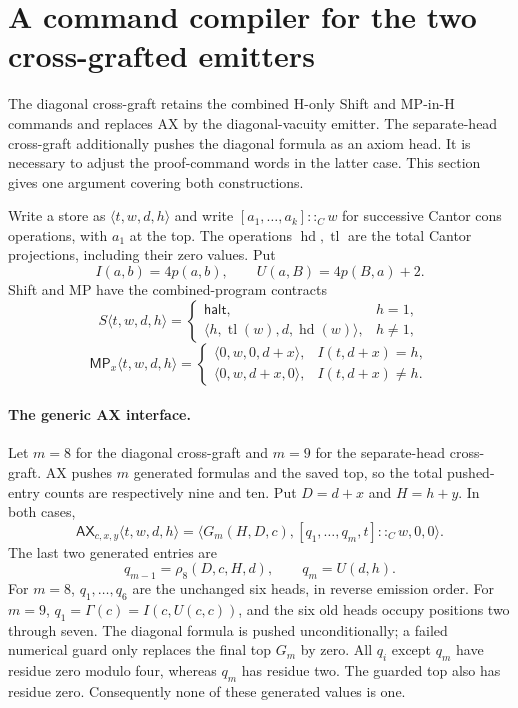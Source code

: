 \section{A command compiler for the two cross-grafted emitters}
\label{sec:graft-command-compiler}

The diagonal cross-graft retains the combined H-only Shift and MP-in-H
commands and replaces AX by the diagonal-vacuity emitter. The separate-head
cross-graft additionally pushes the diagonal formula as an axiom head. It
is necessary to adjust the proof-command words in the latter case. This
section gives one argument covering both constructions.

Write a store as $\langle t,w,d,h\rangle$ and write
$[a_1,\ldots,a_k]::_Cw$ for successive Cantor cons operations, with $a_1$
at the top. The operations $\operatorname{hd},\operatorname{tl}$ are the
total Cantor projections, including their zero values. Put
\[
 I(a,b)=4p(a,b),\qquad U(a,B)=4p(B,a)+2.
\]
Shift and MP have the combined-program contracts
\[
 S\langle t,w,d,h\rangle=
 \begin{cases}\mathsf{halt},&h=1,\\
 \langle h,\operatorname{tl}(w),d,\operatorname{hd}(w)\rangle,&h\ne1,
 \end{cases}
\]
\[
 \mathsf{MP}_x\langle t,w,d,h\rangle=
 \begin{cases}
 \langle0,w,0,d+x\rangle,&I(t,d+x)=h,\\
 \langle0,w,d+x,0\rangle,&I(t,d+x)\ne h.
 \end{cases}
\]

\paragraph{The generic AX interface.}
Let $m=8$ for the diagonal cross-graft and $m=9$ for the separate-head
cross-graft. AX pushes $m$ generated formulas and the saved top, so the
total pushed-entry counts are respectively nine and ten. Put
$D=d+x$ and $H=h+y$. In both cases,
\[
 \mathsf{AX}_{c,x,y}\langle t,w,d,h\rangle
  =\langle G_m(H,D,c),[q_1,\ldots,q_m,t]::_Cw,0,0\rangle.
\]
The last two generated entries are
\[
 q_{m-1}=\rho_8(D,c,H,d),\qquad q_m=U(d,h).
\]
For $m=8$, $q_1,\ldots,q_6$ are the unchanged six heads, in reverse
emission order. For $m=9$, $q_1=\Gamma(c)=I(c,U(c,c))$, and the six old
heads occupy positions two through seven. The diagonal formula is pushed
unconditionally; a failed numerical guard only replaces the final top
$G_m$ by zero. All $q_i$ except $q_m$ have residue zero modulo four,
whereas $q_m$ has residue two. The guarded top also has residue zero.
Consequently none of these generated values is one.

